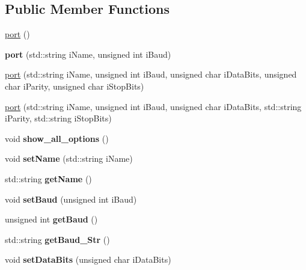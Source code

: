 \subsection*{Public Member Functions}
\begin{DoxyCompactItemize}
\item 
\hyperlink{classport_a5f40cbc450a8b0342a79b6e7ca4886e9}{port} ()
\item 
{\bfseries port} (std\+::string i\+Name, unsigned int i\+Baud)\hypertarget{classport_a1d2f8f629710d8f719d6641305d662f4}{}\label{classport_a1d2f8f629710d8f719d6641305d662f4}

\item 
\hyperlink{classport_acc336a1b8c9dacdd42914db803f2bd60}{port} (std\+::string i\+Name, unsigned int i\+Baud, unsigned char i\+Data\+Bits, unsigned char i\+Parity, unsigned char i\+Stop\+Bits)
\item 
\hyperlink{classport_a56b439f7dc620ddae93fa15bd8337cad}{port} (std\+::string i\+Name, unsigned int i\+Baud, unsigned char i\+Data\+Bits, std\+::string i\+Parity, std\+::string i\+Stop\+Bits)
\item 
void {\bfseries show\+\_\+all\+\_\+options} ()\hypertarget{classport_acaea3feacd669eac2f0c43c077727405}{}\label{classport_acaea3feacd669eac2f0c43c077727405}

\item 
void {\bfseries set\+Name} (std\+::string i\+Name)\hypertarget{classport_ab6ae1d0566a3e8df1d660892695f28ab}{}\label{classport_ab6ae1d0566a3e8df1d660892695f28ab}

\item 
std\+::string {\bfseries get\+Name} ()\hypertarget{classport_aaec0b4abf712f703fef9148e03cf9270}{}\label{classport_aaec0b4abf712f703fef9148e03cf9270}

\item 
void {\bfseries set\+Baud} (unsigned int i\+Baud)\hypertarget{classport_a305ee41a458ae38a0fa993b493be3563}{}\label{classport_a305ee41a458ae38a0fa993b493be3563}

\item 
unsigned int {\bfseries get\+Baud} ()\hypertarget{classport_a631542200faf4b6174f6b8ff46a0b1c0}{}\label{classport_a631542200faf4b6174f6b8ff46a0b1c0}

\item 
std\+::string {\bfseries get\+Baud\+\_\+\+Str} ()\hypertarget{classport_a5cdec26dd0ef22a9a529deed6bb15711}{}\label{classport_a5cdec26dd0ef22a9a529deed6bb15711}

\item 
void {\bfseries set\+Data\+Bits} (unsigned char i\+Data\+Bits)\hypertarget{classport_a27054cad9622e4ea62b6815de8058a90}{}\label{classport_a27054cad9622e4ea62b6815de8058a90}


\end{DoxyCompactItemize}
